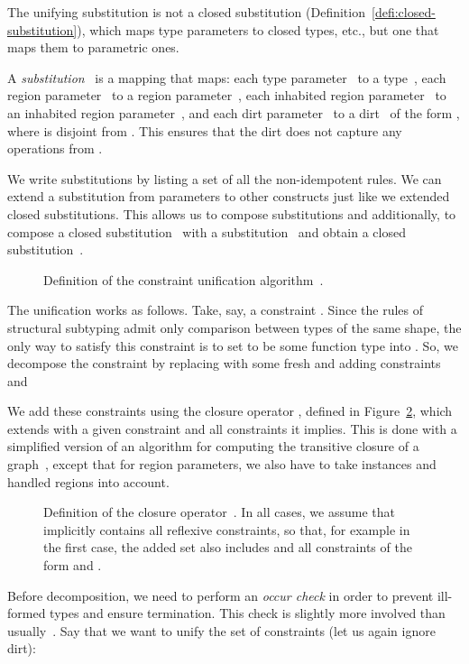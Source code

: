 \documentclass{LMCS}
\begin{document}
The unifying substitution is not a closed substitution (Definition~\ref{defi:closed-substitution}),
which maps type parameters to closed types, etc., but one that maps them to parametric ones. 
\begin{defi}
A \emph{substitution}~ is a mapping that maps:
  each type parameter~ to a type~,
  each region parameter~ to a region parameter~,
  each inhabited region parameter~ to an inhabited region parameter~,
  and each dirt parameter~ to a dirt~
  of the form ,
  where  is disjoint from .
This ensures that the dirt 
does not capture any operations from .
\end{defi}
We write substitutions by listing a set of all the non-idempotent rules.
We can extend a substitution from parameters to other constructs just like we extended closed substitutions.
This allows us to compose substitutions and additionally,
to compose a closed substitution~ with a substitution~
and obtain a closed substitution~.

\begin{figure}
\small
\hrulefill

\caption{Definition of the constraint unification algorithm~.}
\label{fig:unify}
\hrulefill
\end{figure}

The unification works as follows.
Take, say, a constraint .
Since the rules of structural subtyping admit only comparison between types of the same shape,
the only way to satisfy this constraint is to set  to be some function type into .
So, we decompose the constraint by replacing  with some fresh 
and adding constraints  and 

We add these constraints using the closure operator , defined in Figure~\ref{fig:closure},
which extends  with a given constraint and all constraints it implies.
This is done with a simplified version of an algorithm for computing the transitive closure of a graph~\cite{pottier1998type},
except that for region parameters, we also have to take instances and handled regions into account.

\begin{figure}[h]
\small
\hrulefill

\caption{Definition of the closure operator~.
In all cases, we assume that  implicitly contains all reflexive constraints,
so that, for example in the first case,
the added set also includes  and all constraints of the form  and .}
\label{fig:closure}
\hrulefill
\end{figure}

Before decomposition, we need to perform an \emph{occur check}
in order to prevent ill-formed types and ensure termination.
This check is slightly more involved than usually~\cite[p.~327]{pierce2002types}.
Say that we want to unify the set of constraints (let us again ignore dirt):
\end{document}
